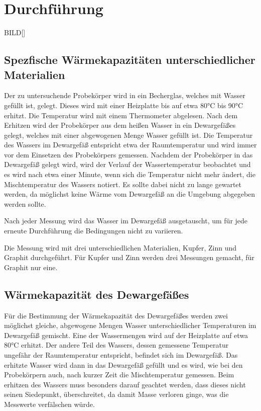 \section{Durchführung}
\label{sec:Durchführung}

BILD[]

\subsection{Spezfische Wärmekapazitäten unterschiedlicher Materialien}

Der zu untersuchende Probekörper wird in ein Becherglas, welches mit Wasser gefüllt ist, gelegt. Dieses wird mit einer Heizplatte
bis auf etwa 80\si{\celsius} bis 90\si{\celsius} erhitzt. Die Temperatur wird mit einem Thermometer abgelesen. Nach dem Erhitzen wird der 
Probekörper aus dem heißen Wasser in ein Dewargefäßes gelegt, welches mit einer abgewogenen Menge Wasser gefüllt ist. Die Temperatur
des Wassers im Dewargefäß entspricht etwa der Raumtemperatur und wird immer vor dem Einsetzen des Probekörpers gemessen. Nachdem der
Probekörper in das Dewargefäß gelegt wird, wird der Verlauf der Wassertemperatur beobachtet und es wird nach etwa einer Minute,
wenn sich die Temperatur nicht mehr ändert, die
Mischtemperatur des Wassers notiert. Es sollte dabei nicht zu lange gewartet werden, da möglichst keine Wärme vom Dewargefäß an 
die Umgebung abgegeben werden sollte. 

Nach jeder Messung wird das Wasser im Dewargefäß ausgetauscht, um für jede erneute Durchführung die Bedingungen nicht zu variieren.

Die Messung wird mit drei unterschiedlichen Materialien, Kupfer, Zinn und Graphit durchgeführt. Für Kupfer und Zinn werden drei
Messungen gemacht, für Graphit nur eine.

\subsection{Wärmekapazität des Dewargefäßes}

Für die Bestimmung der Wärmekapazität des Dewargefäßes werden zwei möglichst gleiche, abgewogene Mengen Wasser unterschiedlicher
Temperaturen im Dewargefäß gemischt. Eine der Wassermengen wird auf der Heizplatte auf etwa 80\si{\celsius} erhitzt. Der andere
Teil des Wassers, dessen gemessene Temperatur ungefähr der Raumtemperatur entspricht, befindet sich im Dewargefäß. 
Das erhitzte Wasser wird dann in das Dewargefäß gefüllt und es wird, wie bei den Probekörpern auch, nach kurzer Zeit die 
Mischtemperatur gemessen. Beim erhitzen des Wassers muss besonders darauf geachtet werden, dass dieses nicht seinen Siedepunkt,
überschreitet, da damit Masse verloren ginge, was die Messwerte verfälschen würde.

